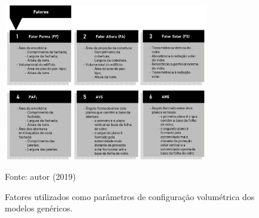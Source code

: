     \begin{figure}[ht]
        \centering
        \caption{\small Fatores utilizados como parâmetros de configuração volumétrica dos modelos genéricos.}
        \includegraphics[width=0.8\textwidth]{figures/fig10_Fluxogramas-2.jpg}
        \begin{flushleft}
            \par \small Fonte: autor (2019)
        \end{flushleft}
        \label{fig:figura8}
    \end{figure}

